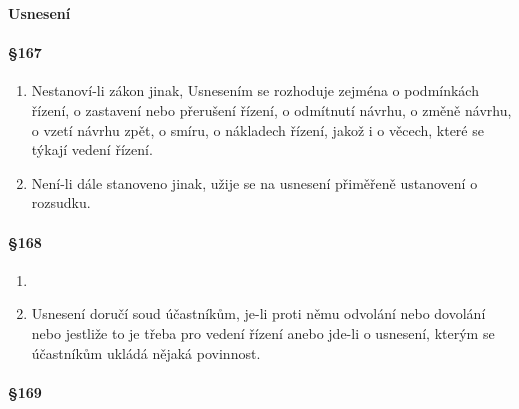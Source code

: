 \textbf{\Large Usnesení}

\paragraph{\S 167}

\begin{enumerate}[label={(\arabic*)}]
  \item Nestanoví-li zákon jinak,  Usnesením se rozhoduje zejména o podmínkách řízení, o zastavení nebo přerušení řízení, o odmítnutí návrhu, o změně návrhu, o vzetí návrhu zpět, o smíru, o nákladech řízení, jakož i o věcech, které se týkají vedení řízení.
  \item Není-li dále stanoveno jinak, užije se na usnesení přiměřeně ustanovení o rozsudku.
\end{enumerate}

\paragraph{\S 168}

\begin{enumerate}[label={(\arabic*)}]
  \item {}
  \item Usnesení doručí soud účastníkům, je-li proti němu odvolání nebo dovolání nebo jestliže to je třeba pro vedení řízení anebo jde-li o usnesení, kterým se účastníkům ukládá nějaká povinnost.
\end{enumerate}

\paragraph{\S 169}

